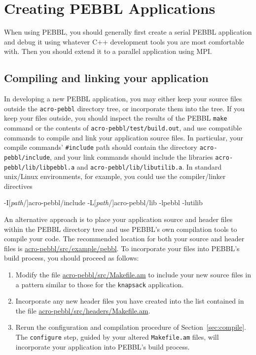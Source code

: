 \section{Creating PEBBL Applications}

When using PEBBL, you should generally first create a serial PEBBL
application and debug it using whatever C++ development tools
you are most comfortable with.  Then you should extend it to a
parallel application using MPI.

\subsection{Compiling and linking your application}
In developing a new PEBBL application, you may either keep your source
files outside the \texttt{acro-pebbl} directory tree, or incorporate
them into the tree.  If you keep your files outside, you should
inspect the results of the PEBBL \texttt{make} command or the contents
of \texttt{acro-pebbl/test/build.out}, and use compatible commands to
compile and link your application source files.  In particular, your
compile commands' \texttt{\#include} path should contain the directory
\texttt{acro-pebbl/include}, and your link commands should include the
libraries \texttt{acro-pebbl/lib/libpebbl.a} and
\texttt{acro-pebbl/lib/libutilib.a}.  In standard unix/Linux
environments, for example, you could use the compiler/linker directives
\begin{codeblock}
-I\textrm{[\emph{path}}/\textrm{]}acro-pebbl/include
-L\textrm{[\emph{path}}/\textrm{]}acro-pebbl/lib -lpebbl -lutilib
\end{codeblock}
An alternative approach is to place your application source and header
files within the PEBBL directory tree and use PEBBL's own compilation
tools to compile your code.  The recommended location for both your
source and header files is \url{acro-pebbl/src/example/pebbl}.  To
incorporate your files into PEBBL's build process, you should proceed
as follows:
\begin{enumerate}
\item Modify the file \url{acro-pebbl/src/Makefile.am}
  to include your new source files in a pattern similar to those for
  the \texttt{knapsack} application.  
\item Incorporate any
  new header files you have created into the list contained in the
  file \url{acro-pebbl/src/headers/Makefile.am}.  
\item Rerun the configuration and compilation procedure of
  Section~\ref{sec:compile}.  The \texttt{configure} step, guided by
  your altered \texttt{Makefile.am} files, will incorporate your
  application into PEBBL's build process.
\end{enumerate}

